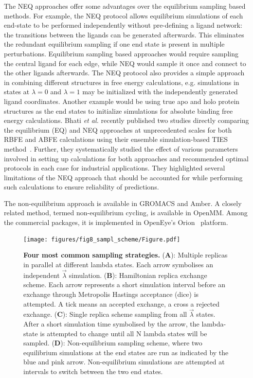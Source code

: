 \documentclass[9pt,bestpractices]{livecoms}
\begin{document}
The NEQ approaches offer some advantages over the equilibrium sampling based methods. For example, the NEQ protocol allows equilibrium simulations of each end-state to be performed independently without pre-defining a ligand network: the transitions between the ligands can be generated afterwards. This eliminates the redundant equilibrium sampling if one end state is present in multiple perturbations. Equilibrium sampling based approaches would require sampling the central ligand for each edge, while NEQ would sample it once and connect to the other ligands afterwards. The NEQ protocol also provides a simple approach in combining different structures in free energy calculations, e.g. simulations in states at $\lambda=0$ and $\lambda=1$ may be initialized with the independently generated ligand coordinates. Another example would be using true apo and holo protein structures as the end states to initialize simulations for absolute binding free energy calculations. 
Bhati \textit{et al.} recently published two studies directly comparing the equilibrium (EQ) and NEQ approaches at unprecedented scales for both RBFE and ABFE calculations using their ensemble simulation-based TIES method~\cite{wan2023eqvsneq, bhati2025}. Further, they systematically studied the effect of various parameters involved in setting up calculations for both approaches and recommended optimal protocols in each case for industrial applications. They highlighted several limitations of the NEQ approach that should be accounted for while performing such calculations to ensure reliability of predictions.

The non-equilibrium approach is available in GROMACS and Amber. A closely related method, termed non-equilibrium cycling, is available in OpenMM. Among the commercial packages, it is implemented in OpenEye's Orion{\textregistered}~\cite{sorensen2024orion} platform.

\begin{figure}
    \texttt{[image: figures/fig8\_sampl\_scheme/Figure.pdf]}
    \caption{\textbf{Four most common sampling strategies.} (\textbf{A}): Multiple replicas in parallel at different lambda states. Each arrow symbolises an independent $\vec{\lambda}$ simulation. (\textbf{B}): Hamiltonian replica exchange scheme. Each arrow represents a short simulation interval before an exchange through Metropolis Hastings acceptance (dice) is attempted. A tick means an accepted exchange, a cross a rejected exchange. (\textbf{C}): Single replica scheme sampling from all $\vec{\lambda}$ states. After a short simulation time symbolised by the arrow, the lambda-state is attempted to change until all N lambda states will be sampled. (\textbf{D}): Non-equilibrium sampling scheme, where two equilibrium simulations at the end states are run as indicated by the blue and pink arrow. Non-equilibrium simulations are attempted at intervals to switch between the two end states.}
    \label{fig:fig_sampling_scheme}
\end{figure} 
\end{document}
